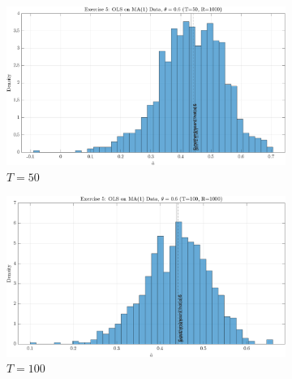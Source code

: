 \documentclass[dvipsnames,11pt]{article}
\begin{document}
\begin{solution}
        \begin{figure}[h]
                     \centering
                     \begin{subfigure}[b]{0.49\textwidth}
                         \centering
                         \includegraphics[width=\textwidth, trim=0cm 0cm 0cm 0.55cm, clip]{output/ex5_hist_T50.png}
                         \caption{\(T=50\)}
                         \label{fig:ex5_hist_T50}                         
                     \end{subfigure}
                     \hfill
                     \begin{subfigure}[b]{0.49\textwidth}
                         \centering
                         \includegraphics[width=\textwidth, trim=0cm 0cm 0cm 0.55cm, clip]{output/ex5_hist_T100.png}
                         \caption{\(T=100\)}
                         \label{fig:ex5_hist_T100}
                     \end{subfigure}
                     \hfill
                     \begin{subfigure}[b]{0.49\textwidth}
                         \centering

\end{subfigure}
\end{figure}
\end{solution}
\end{document}
